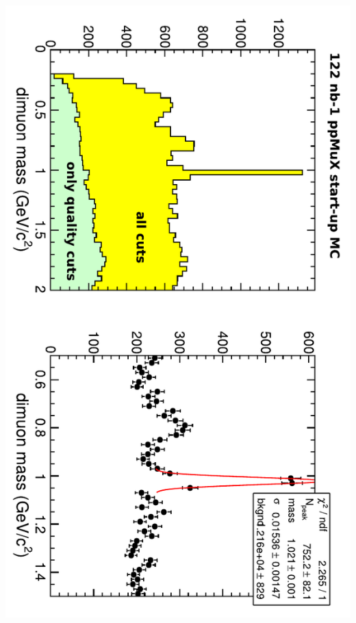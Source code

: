 \documentclass[compress]{beamer}
\begin{document}
\begin{frame}
\begin{columns}
\includegraphics[height=\linewidth, angle=90]{phi_to_mumu_MC.pdf}
\end{columns}
\end{frame}
\end{document}
